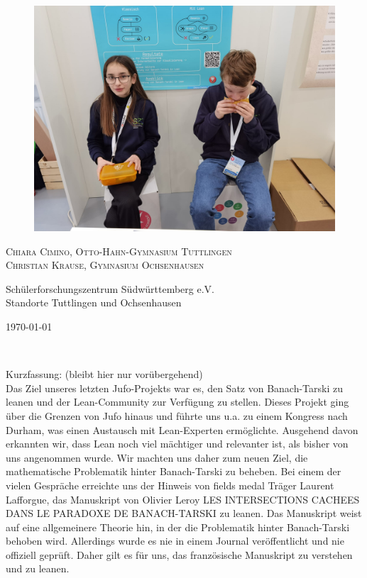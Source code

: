 \documentclass{article}
\begin{document}
\vspace{0.4cm}
\begin{figure}[ht]

   \centering

    \includegraphics[scale=0.17]{PHOTO-2024-02-28-18-14-19.jpg}

\end{figure}
 \begin{center}

 
     \Large\textsc{Chiara Cimino, Otto-Hahn-Gymnasium Tuttlingen\\Christian Krause, Gymnasium Ochsenhausen}\\\vspace{1cm}

    Schülerforschungszentrum Südwürttemberg e.V.\\Standorte Tuttlingen und Ochsenhausen  \vspace{1.5cm}

     \today

 \end{center}~
 \clearpage

\tableofcontents
\listoffigures
\thispagestyle{empty}

Kurzfassung: (bleibt hier nur vorübergehend)\\

Das Ziel unseres letzten Jufo-Projekts war es, den Satz von Banach-Tarski zu leanen und der Lean-Community zur Verfügung zu stellen. Dieses Projekt ging über die Grenzen von Jufo hinaus und führte uns u.a. zu einem Kongress nach Durham, was einen Austausch mit Lean-Experten ermöglichte. Ausgehend davon erkannten wir, dass Lean noch viel mächtiger und relevanter ist, als bisher von uns angenommen wurde. Wir machten uns daher zum neuen Ziel, die mathematische Problematik hinter Banach-Tarski zu beheben. Bei einem der vielen Gespräche erreichte uns der Hinweis von fields medal Träger Laurent Lafforgue, das Manuskript von Olivier Leroy LES INTERSECTIONS CACHEES DANS LE PARADOXE DE BANACH-TARSKI zu leanen. Das Manuskript weist auf eine allgemeinere Theorie hin, in der die Problematik hinter Banach-Tarski behoben wird. Allerdings wurde es nie in einem Journal veröffentlicht und nie offiziell geprüft. Daher gilt es für uns, das französische Manuskript zu verstehen und zu leanen.
\end{document}
